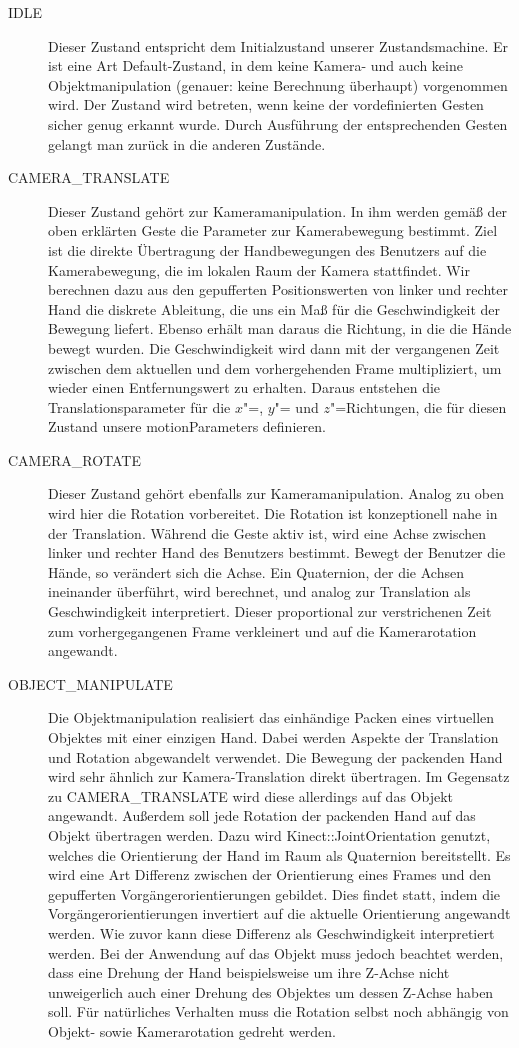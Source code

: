 	\begin{description}
		\item[IDLE] Dieser Zustand entspricht dem Initialzustand unserer Zustandsmachine. Er ist eine Art Default-Zustand, in dem keine Kamera- und auch keine Objektmanipulation (genauer: keine Berechnung überhaupt) vorgenommen wird. Der Zustand wird betreten, wenn keine der vordefinierten Gesten sicher genug erkannt wurde. Durch Ausführung der entsprechenden Gesten gelangt man zurück in die anderen Zustände.
		\item[CAMERA\_TRANSLATE] Dieser Zustand gehört zur Kameramanipulation. In ihm werden gemäß der oben erklärten Geste die Parameter zur Kamerabewegung bestimmt. Ziel ist die direkte Übertragung der Handbewegungen des Benutzers auf die Kamerabewegung, die im lokalen Raum der Kamera stattfindet. Wir berechnen dazu aus den gepufferten Positionswerten von linker und rechter Hand die diskrete Ableitung, die uns ein Maß für die Geschwindigkeit der Bewegung liefert. Ebenso erhält man daraus die Richtung, in die die Hände bewegt wurden. Die Geschwindigkeit wird dann mit der vergangenen Zeit zwischen dem aktuellen und dem vorhergehenden Frame multipliziert, um wieder einen Entfernungswert zu erhalten. Daraus entstehen die Translationsparameter für die $x$"=, $y$"= und $z$"=Richtungen, die für diesen Zustand unsere motionParameters definieren.
		\item[CAMERA\_ROTATE] Dieser Zustand gehört ebenfalls zur Kameramanipulation. Analog zu oben wird hier die Rotation vorbereitet. Die Rotation ist konzeptionell nahe in der Translation. Während die Geste aktiv ist, wird eine Achse zwischen linker und rechter Hand des Benutzers bestimmt. Bewegt der Benutzer die Hände, so verändert sich die Achse. Ein Quaternion, der die Achsen ineinander überführt, wird berechnet, und analog zur Translation als Geschwindigkeit interpretiert. Dieser proportional zur verstrichenen Zeit zum vorhergegangenen Frame verkleinert und auf die Kamerarotation angewandt.
		\item[OBJECT\_MANIPULATE] Die Objektmanipulation realisiert das einhändige Packen eines virtuellen Objektes mit einer einzigen Hand. Dabei werden Aspekte der Translation und Rotation abgewandelt verwendet. Die Bewegung der packenden Hand wird sehr ähnlich zur Kamera-Translation direkt übertragen. Im Gegensatz zu CAMERA\_TRANSLATE wird diese allerdings auf das Objekt angewandt. Außerdem soll jede Rotation der packenden Hand auf das Objekt übertragen werden. Dazu wird Kinect::JointOrientation genutzt, welches die Orientierung der Hand im Raum als Quaternion bereitstellt. Es wird eine Art Differenz zwischen der Orientierung eines Frames und den gepufferten Vorgängerorientierungen gebildet. Dies findet statt, indem die Vorgängerorientierungen invertiert auf die aktuelle Orientierung angewandt werden. Wie zuvor kann diese Differenz als Geschwindigkeit interpretiert werden. Bei der Anwendung auf das Objekt muss jedoch beachtet werden, dass eine Drehung der Hand beispielsweise um ihre Z-Achse nicht unweigerlich auch einer Drehung des Objektes um dessen Z-Achse haben soll. Für natürliches Verhalten muss die Rotation selbst noch abhängig von Objekt- sowie Kamerarotation gedreht werden.

\end{description}
